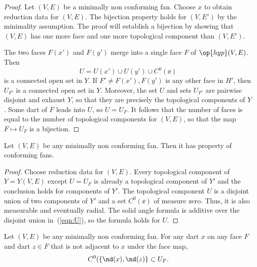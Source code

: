 \begin{proof} Let $(V,E)$ be a minimally non conforming fan.  
Choose $x$ to obtain reduction data
for $(V,E)$.  
 The bijection property holds
for $(V,E')$ by the minimality assumption.  The proof will establish a bijection by showing
that $(V,E)$ has one more face
and one more topological component than $(V,E')$.

The
two faces $F(x')$ and $F(y')$ merge into a single face $F$ of
$\op{hyp}(V,E)$.  Then
\begin{equation}\label{eqn:U}
U= U(x')\cup U(y')\cup C^0(\ee)
\end{equation} 
is a connected open set in $Y$.  If $F'\ne F(x'),F(y')$ is any other
face in $H'$, then $U_{F'}$ is a connected open set in $Y$.  Moreover,
the set $U$ and sets $U_{F'}$ are pairwise disjoint and exhaust $Y$,
so that they are precisely the topological components of $Y$.  Some
dart of $F$ leads into $U$, so $U=U_F$. 
It follows that the number of
faces is equal to the number of topological components for $(V,E)$, so that the
map $F\mapsto U_F$ is a bijection.
\end{proof}


\begin{lemma}[] Let $(V,E)$ be any minimally
non conforming fan.  Then it has property  of
conforming fans.
\end{lemma}

\begin{proof} Choose reduction data for $(V,E)$.  Every topological
component of $Y=Y(V,E)$ except $U=U_F$ is already a topological
component of $Y'$ and the conclusion holds for components of $Y'$.
The topological component $U$ is a disjoint union of two components
of $Y'$ and a set $C^0(\ee)$ of measure zero.  Thus, it is also
measurable and eventually radial.  The solid angle formula is
additive over the disjoint union in~(\ref{eqn:U}), so the formula
holds for $U$.
\end{proof}
%


\begin{lemma}[] Let $(V,E)$ be any minimally
non conforming fan.  For any dart $x$ on any face $F$ and dart $z\in
F$ that is not adjacent to $x$ under the face map,
\begin{displaymath}
C^0(\{\nd(x),\nd(z)\} \subset U_F.
\end{displaymath}
\end{lemma}

